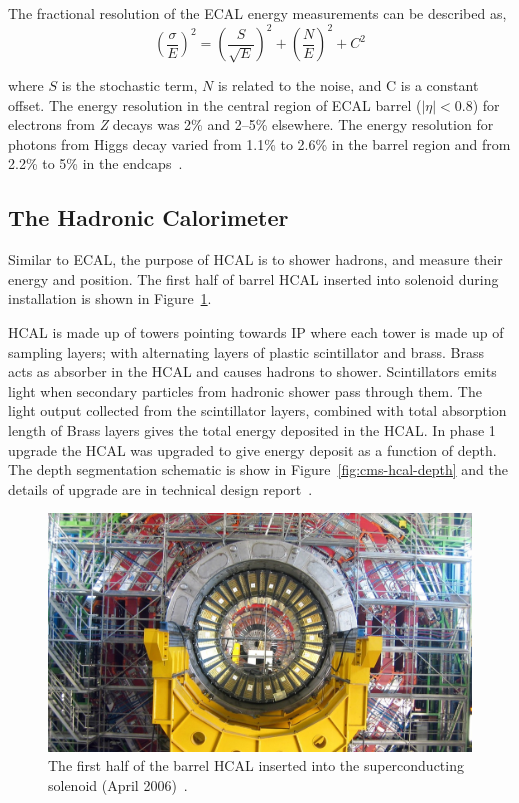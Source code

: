 The fractional resolution of the \gls{ECAL} energy measurements can be described as,
%
\begin{equation}
  {\left( \frac{\sigma}{E} \right)}^2
  = {\left( \frac{S}{\sqrt{E}} \right)}^2
  + {\left( \frac{N}{E} \right)}^2
  + C^2
\end{equation}

where \(S \) is the stochastic term, \(N \) is related to the noise,
and C is a constant offset. The energy resolution in the central
region of \gls{ECAL} barrel (\( |\eta| < 0.8 \)) for electrons from \textit{Z}
decays was 2\% and 2--5\% elsewhere. The energy resolution for photons
from Higgs decay varied from 1.1\% to 2.6\% in the barrel region and
from 2.2\% to 5\% in the endcaps~\cite{energy-ecal-7tev}.

\subsection{
  The Hadronic Calorimeter
}

Similar to \gls{ECAL}, the purpose of \gls{HCAL}
is to shower hadrons, and measure their energy and position.
The first half of barrel \gls{HCAL} inserted into solenoid during installation
is shown in Figure~\ref{fig:cms-hcal-inserted}.

\gls{HCAL} is made up of
towers pointing towards \gls{IP} where each tower is made up of sampling layers;
with alternating layers of plastic scintillator and brass.
Brass acts as absorber in the \gls{HCAL} and causes hadrons to shower.
Scintillators emits light when secondary particles
from hadronic shower pass through them.
The light output collected from the scintillator layers, combined with
total absorption length of Brass layers
gives the total energy deposited in the \gls{HCAL}.
In phase 1 upgrade the \gls{HCAL} was upgraded
to give energy deposit as a function of depth.
The depth segmentation schematic is
show in Figure~\ref{fig:cms-hcal-depth} and the details of upgrade are in technical design
report~\cite{cms-hcal-upgrade}.

\begin{figure}[!ht]
  \centering
  \includegraphics[width=\textwidth]{figures/cms_hcal_hb_inserted.jpg}
  \caption[The first half of the barrel \gls{HCAL} inserted into the
    superconducting solenoid (April 2006)]%
  {The first half of the barrel \gls{HCAL} inserted into the
    superconducting solenoid (April 2006)~\cite{image-cms-hcal-inserted}.}%
  \label{fig:cms-hcal-inserted}
\end{figure}

